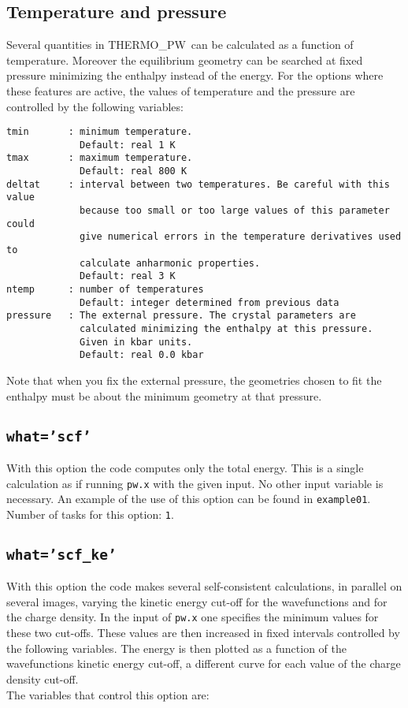 \documentclass[12pt,a4paper]{article}
\def\tpw{{\sc THERMO\_PW}}
\begin{document}
\subsection{\color{web-blue}Temperature and pressure}
Several quantities in \tpw\ can be calculated as a function of temperature.
Moreover the equilibrium geometry can be searched at fixed pressure 
minimizing the enthalpy instead of the energy.
For the options where these features are active, the values of temperature
and the pressure are controlled by the following variables:
\begin{verbatim}
tmin       : minimum temperature.
             Default: real 1 K
tmax       : maximum temperature.
             Default: real 800 K
deltat     : interval between two temperatures. Be careful with this value
             because too small or too large values of this parameter could 
             give numerical errors in the temperature derivatives used to 
             calculate anharmonic properties.
             Default: real 3 K
ntemp      : number of temperatures
             Default: integer determined from previous data
pressure   : The external pressure. The crystal parameters are
             calculated minimizing the enthalpy at this pressure. 
             Given in kbar units. 
             Default: real 0.0 kbar
\end{verbatim}
Note that when you fix the external pressure, the geometries chosen to 
fit the enthalpy must be about the minimum geometry at that pressure.

\subsection{\color{web-blue}\texttt{what='scf'}}
With this option the code computes only the total energy. This is a single
calculation as if running \texttt{pw.x} with the given input.
No other input variable is necessary.
An example of the use of this option can be found in \texttt{example01}. \\
Number of tasks for this option: \texttt{1}.

\subsection{\color{web-blue}\texttt{what='scf\_ke'}}
With this option the code makes several self-consistent calculations, 
in parallel on several images, varying the kinetic energy cut-off for 
the wavefunctions and for the charge density. 
In the input of \texttt{pw.x} one specifies the minimum values for these two 
cut-offs. These values are then increased in fixed intervals controlled by the 
following variables. The energy is then plotted as a function of the 
wavefunctions kinetic energy cut-off, a different curve for each value of 
the charge density cut-off. \\
The variables that control this option are:
\end{document}
